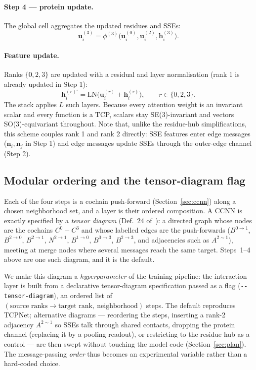 \documentclass[11pt,a4paper]{article}
\theoremstyle{definition}
\begin{document}
\paragraph{Step 4 --- protein update.} The global cell aggregates the updated
residues and SSEs:
\[
\mathbf{u}^{(3)}_i=\phi^{(3)}\big(\mathbf{u}^{(0)}_i,\mathbf{u}^{(2)}_i,\mathbf{h}^{(3)}_i\big).
\]

\paragraph{Feature update.} Ranks $\{0,2,3\}$ are updated with a residual and layer
normalisation (rank 1 is already updated in Step 1):
\[
\mathbf{h}^{(r)\prime}_i=\mathrm{LN}\big(\mathbf{u}^{(r)}_i+\mathbf{h}^{(r)}_i\big),\qquad r\in\{0,2,3\}.
\]
The stack applies $L$ such layers. Because every attention weight is an invariant
scalar and every function is a TCP, scalars stay SE(3)-invariant and vectors
SO(3)-equivariant throughout. Note that, unlike the residue-hub simplifications,
this scheme couples rank 1 and rank 2 directly: SSE features enter edge messages
($\mathbf{n}_i,\mathbf{n}_j$ in Step 1) and edge messages update SSEs through the
outer-edge channel (Step 2).

\subsection{Modular ordering and the tensor-diagram flag}
\label{sec:modular}

Each of the four steps is a cochain push-forward (Section~\ref{sec:ccnn}) along a
chosen neighborhood set, and a layer is their ordered composition. A CCNN is
exactly specified by a \emph{tensor diagram} (Def.~24 of~\cite{hoan}): a directed
graph whose nodes are the cochains $C^{0}\!-\!C^{3}$ and whose labelled edges are the
push-forwards ($B^{0\to1}$, $B^{2\to0}$, $B^{2\to1}$, $N^{2\to1}$, $B^{1\to0}$,
$B^{0\to3}$, $B^{2\to3}$, and adjacencies such as $A^{2\sim1}$), meeting at merge
nodes where several messages reach the same target. Steps~1--4 above are one such
diagram, and it is the default.

We make this diagram a \emph{hyperparameter} of the training pipeline: the
interaction layer is built from a declarative tensor-diagram specification passed as
a flag (\texttt{-{}-tensor-diagram}), an ordered list of
$(\text{source ranks}\to\text{target rank},\ \text{neighborhood})$ steps. The
default reproduces TCPNet; alternative diagrams --- reordering the steps, inserting a
rank-2 adjacency $A^{2\sim1}$ so SSEs talk through shared contacts, dropping the
protein channel (replacing it by a pooling readout), or restricting to the residue
hub as a control --- are then swept without touching the model code
(Section~\ref{sec:plan}). The message-passing \emph{order} thus becomes an
experimental variable rather than a hard-coded choice.
\end{document}
